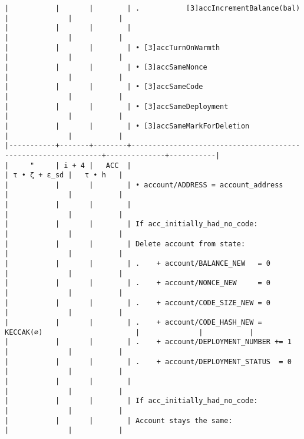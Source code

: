 \documentclass[varwidth=\maxdimen,margin=0.5cm,multi={verbatim}]{standalone}
\begin{document}
\begin{verbatim}
|           |       |        | .           [3]accIncrementBalance(bal)                       |              |           |
|           |       |        |                                                               |              |           |
|           |       |        | • [3]accTurnOnWarmth                                          |              |           |
|           |       |        | • [3]accSameNonce                                             |              |           |
|           |       |        | • [3]accSameCode                                              |              |           |
|           |       |        | • [3]accSameDeployment                                        |              |           |
|           |       |        | • [3]accSameMarkForDeletion                                   |              |           |
|-----------+-------+--------+---------------------------------------------------------------+--------------+-----------|
|     "     | i + 4 |   ACC  |                                                               | τ • ζ + ε_sd |   τ • h   |
|           |       |        | • account/ADDRESS = account_address                           |              |           |
|           |       |        |                                                               |              |           |
|           |       |        | If acc_initially_had_no_code:                                 |              |           |
|           |       |        | Delete account from state:                                    |              |           |
|           |       |        | .    + account/BALANCE_NEW   = 0                              |              |           |
|           |       |        | .    + account/NONCE_NEW     = 0                              |              |           |
|           |       |        | .    + account/CODE_SIZE_NEW = 0                              |              |           |
|           |       |        | .    + account/CODE_HASH_NEW = KECCAK(∅)                      |              |           |
|           |       |        | .    + account/DEPLOYMENT_NUMBER += 1                         |              |           |
|           |       |        | .    + account/DEPLOYMENT_STATUS  = 0                         |              |           |
|           |       |        |                                                               |              |           |
|           |       |        | If acc_initially_had_no_code:                                 |              |           |
|           |       |        | Account stays the same:                                       |              |           |

\end{verbatim}
\end{document}
